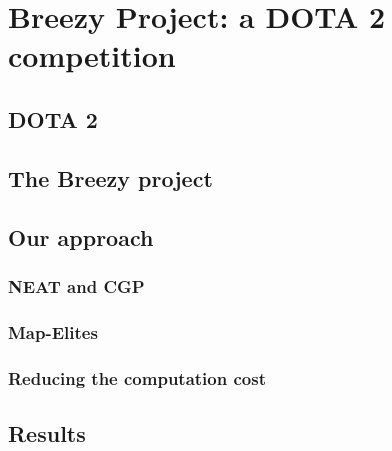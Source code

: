 \chapter{Breezy Project: a DOTA 2 competition}
\label{sec:dota}

\section{DOTA 2}

\section{The Breezy project}

\section{Our approach}
\subsection{NEAT and CGP}
\subsection{Map-Elites}
\subsection{Reducing the computation cost}

\section{Results}

